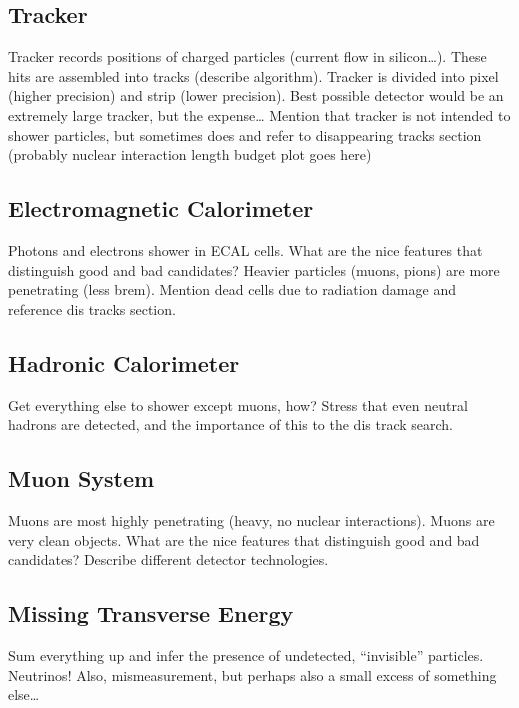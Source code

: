   \subsection{Tracker} \label{sec:tracker}

  Tracker records positions of charged particles (current flow in silicon\ldots).
  These hits are assembled into tracks (describe algorithm). 
  Tracker is divided into pixel (higher precision) and strip (lower precision).
  Best possible detector would be an extremely large tracker, but the expense\ldots
  Mention that tracker is not intended to shower particles, but sometimes does and refer to disappearing tracks section (probably nuclear interaction length budget plot goes here)

  \subsection{Electromagnetic Calorimeter} \label{sec:ecal}

  Photons and electrons shower in ECAL cells.
  What are the nice features that distinguish good and bad candidates?
  Heavier particles (muons, pions) are more penetrating (less brem).
  Mention dead cells due to radiation damage and reference dis tracks section.

  \subsection{Hadronic Calorimeter} \label{sec:hcal}

  Get everything else to shower except muons, how?  
  Stress that even neutral hadrons are detected, and the importance of this to the dis track search.

  \subsection{Muon System} \label{sec:muon}

  Muons are most highly penetrating (heavy, no nuclear interactions).
  Muons are very clean objects.
  What are the nice features that distinguish good and bad candidates?
  Describe different detector technologies.

  \subsection{Missing Transverse Energy} \label{sec:MET}

  Sum everything up and infer the presence of undetected, ``invisible'' particles.
  Neutrinos! 
  Also, mismeasurement, but perhaps also a small excess of something else\ldots

